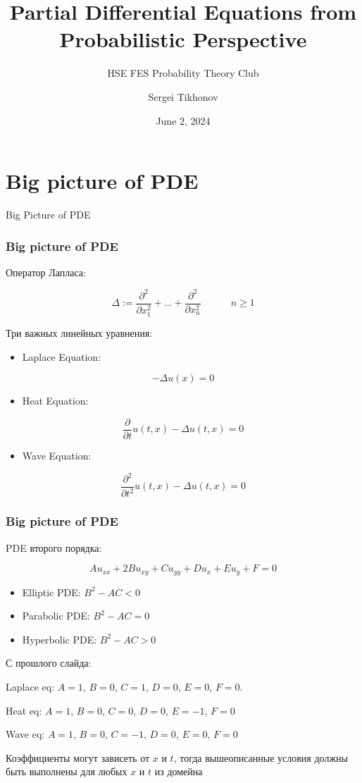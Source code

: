 \documentclass{beamer}
\title{Partial Differential Equations from Probabilistic Perspective}
\subtitle{HSE FES Probability Theory Club}
\author{Sergei Tikhonov}
\date{June 2, 2024}
\begin{document}
\frame{\titlepage}

\tableofcontents
\newpage

\section{Big picture of PDE}

\begin{frame}

Big Picture of PDE


\end{frame}

\begin{frame}
\frametitle{Big picture of PDE}

Оператор Лапласа:

\[
\Delta := \frac{\partial^2}{\partial x_1^2} + ... + \frac{\partial^2}{\partial x_n^2} \quad \quad \quad n \geq 1
\]

Три важных линейных уравнения:

\begin{itemize}
    \item Laplace Equation:
\end{itemize}
\[
- \Delta u(x) = 0
\]

\begin{itemize}
    \item Heat Equation:
\end{itemize}
\[
\frac{\partial}{\partial t} u(t, x) - \Delta u(t, x) = 0
\]

\begin{itemize}
    \item Wave Equation:
\end{itemize}
\[
\frac{\partial^2}{\partial t^2} u(t, x) - \Delta u(t, x) = 0
\]

\end{frame}

\begin{frame}
\frametitle{Big picture of PDE}

PDE второго порядка:

\[
A u_{xx} + 2B u_{xy} + C u_{yy} + D u_{x} + E u_{y} + F = 0
\]

\begin{itemize}
    \item Elliptic PDE: $B^2 - AC < 0$
    \item Parabolic PDE: $B^2 - AC = 0$
    \item Hyperbolic PDE: $B^2 - AC > 0$
\end{itemize}

С прошлого слайда:

Laplace eq: \( A = 1 \), \( B = 0 \), \( C = 1 \), \( D = 0 \), \( E = 0 \), \( F = 0 \).

Heat eq: \( A = 1 \), \( B = 0 \), \( C = 0 \), \( D = 0 \), \( E = -1 \), \( F = 0 \)

Wave eq: \( A = 1 \), \( B = 0 \), \( C = -1 \), \( D = 0 \), \( E = 0 \), \( F = 0 \)

\;

Коэффициенты могут зависеть от $x$ и $t$, тогда вышеописанные условия должны быть выполнены для любых $x$ и $t$ из домейна


\end{frame}
\end{document}
